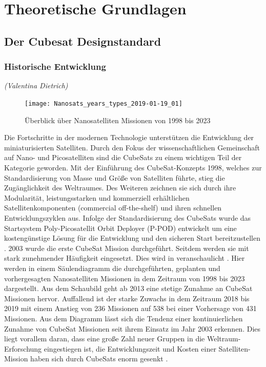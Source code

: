 \chapter{Theoretische Grundlagen}\label{theorie}
\section{Der Cubesat Designstandard}%
	\subsection{Historische Entwicklung}
	\hfill\emph{(Valentina Dietrich)}\\
				\begin{figure}[H]
				\centering
					\texttt{[image: Nanosats\_years\_types\_2019-01-19\_01]}
				\caption{Überblick über Nanosatelliten Missionen von 1998 bis 2023 \cite{ErikKulu.2019}}
				\label{fig:NanosatsTypes}
			\end{figure}		
Die Fortschritte in der modernen Technologie unterstützen die Entwicklung der miniaturisierten Satelliten. Durch den Fokus der wissenschaftlichen Gemeinschaft auf Nano- und Picosatelliten sind die CubeSats zu einem wichtigen Teil der Kategorie geworden. Mit der Einführung des CubeSat-Konzepts 1998, welches zur Standardisierung von Masse und Größe von Satelliten führte, stieg die Zugänglichkeit des Weltraumes. Des Weiteren zeichnen sie sich durch ihre Modularität, leistungsstarken und kommerziell erhältlichen Satellitenkomponenten (commercial off-the-shelf) und ihren schnellen Entwicklungszyklen aus. Infolge der Standardisierung des CubeSats wurde das Startsystem Poly-Picosatellit Orbit Deployer (P-POD) entwickelt um eine kostengünstige Lösung für die Entwicklung und den sicheren Start bereitzustellen \cite[S. 1 - 4]{RahmatSamii.2017}. 2003 wurde die erste CubeSat Mission durchgeführt. Seitdem werden sie mit stark zunehmender Häufigkeit eingesetzt. Dies wird in  veranschaulicht \cite[S. 1]{firstone}.  Hier werden in einem Säulendiagramm die durchgeführten, geplanten und vorhergesagten Nanosatelliten Missionen in dem Zeitraum von 1998 bis 2023 dargestellt. Aus dem Schaubild geht ab 2013 eine stetige Zunahme an CubeSat Missionen hervor. Auffallend ist der starke Zuwachs in dem Zeitraum 2018 bis 2019 mit einem Anstieg von  \num{236} Missionen auf \num{538} bei einer Vorhersage von \num{431} Missionen. Aus dem Diagramm lässt sich die Tendenz einer kontinuierlichen Zunahme von CubeSat Missionen seit ihrem Einsatz im Jahr 2003 erkennen. Dies liegt vorallem daran, dass eine große Zahl neuer Gruppen in die Weltraum-Erforschung eingestiegen ist, die Entwicklungszeit und Kosten einer Satelliten-Mission haben sich durch CubeSats enorm gesenkt \cite[S. 1 - 4]{RahmatSamii.2017}.
	
